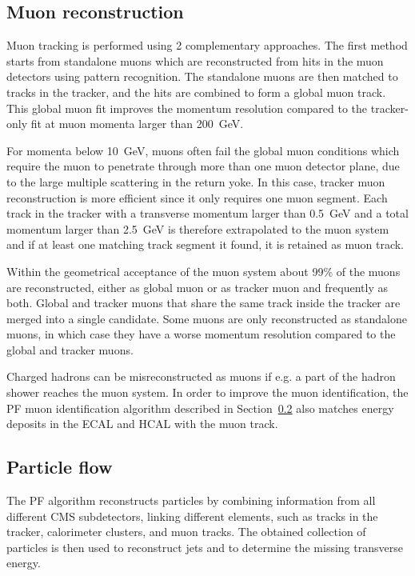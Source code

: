 \subsection{Muon reconstruction}
\label{sec:muon_reconstruction}

Muon tracking is performed using 2 complementary approaches. The first method starts from standalone muons which are reconstructed from hits in the muon detectors using pattern recognition. The standalone muons are then matched to tracks in the tracker, and the hits are combined to form a global muon track. This global muon fit improves the momentum resolution compared to the tracker-only fit at muon momenta larger than \SI{200}{GeV}.

For momenta below \SI{10}{GeV}, muons often fail the global muon conditions which require the muon to penetrate through more than one muon detector plane, due to the large multiple scattering in the return yoke. In this case, tracker muon reconstruction is more efficient since it only requires one muon segment. Each track in the tracker with a transverse momentum larger than \SI{0.5}{GeV} and a total momentum larger than \SI{2.5}{GeV} is therefore extrapolated to the muon system and if at least one matching track segment it found, it is retained as muon track.

Within the geometrical acceptance of the muon system about 99\% of the muons are reconstructed, either as global muon or as tracker muon and frequently as both. Global and tracker muons that share the same track inside the tracker are merged into a single candidate. Some muons are only reconstructed as standalone muons, in which case they have a worse momentum resolution compared to the global and tracker muons.

Charged hadrons can be misreconstructed as muons if e.g. a part of the hadron shower reaches the muon system. In order to improve the muon identification, the \ac{PF} muon identification algorithm described in Section~\ref{sec:PF} also matches energy deposits in the \ac{ECAL} and \ac{HCAL} with the muon track.

\subsection{Particle flow}
\label{sec:PF}

The \acf{PF} algorithm reconstructs particles by combining information from all different \ac{CMS} subdetectors, linking different elements, such as tracks in the tracker, calorimeter clusters, and muon tracks. The obtained collection of particles is then used to reconstruct jets and to determine the missing transverse energy.


